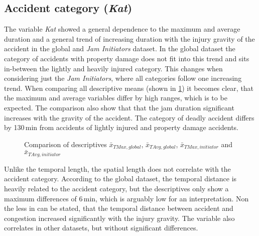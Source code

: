 \subsection{Accident category (\textit{Kat})}
\label{analysis_sum_Kat}
The variable \textit{Kat} showed a general dependence to the maximum and average duration and a general trend of increasing duration with the injury gravity of the accident in the global and \textit{Jam Initiators} dataset. In the global dataset the category of accidents with property damage does not fit into this trend and sits in-between the lightly and heavily injured category. This changes when considering just the \textit{Jam Initiators}, where all categories follow one increasing trend. When comparing all descriptive means (shown in \cref{fig:baysis_summary_Kat_duration_barplot}) it becomes clear, that the maximum and average variables differ by high ranges, which is to be expected. The comparison also show that that the jam duration significant increases with the gravity of the accident. The category of deadly accident differs by 130\,min from accidents of lightly injured and property damage accidents. 
\begin{figure}[ht!]
    \data
    \pgfplotstablesort[sort key=means, sort cmp=float >]{\datasorted}{\data}
    \tiny
    \centering
    \caption{Comparison of descriptives $\bar{x}_{TMax,global}$, $\bar{x}_{TAvg,global}$, $\bar{x}_{TMax,initiator}$ and $\bar{x}_{TAvg,initiator}$}
    \label{fig:baysis_summary_Kat_duration_barplot}
\end{figure}
Unlike the temporal length, the spatial length does not correlate with the accident category. According to the global dataset, the temporal distance is heavily related to the accident category, but the descriptives only show a maximum differences of 6\,min, which is arguably low for an interpretation. Non the less in can be stated, that the temporal distance between accident and congestion increased significantly with the injury gravity. The variable also correlates in other datasets, but without significant differences.

